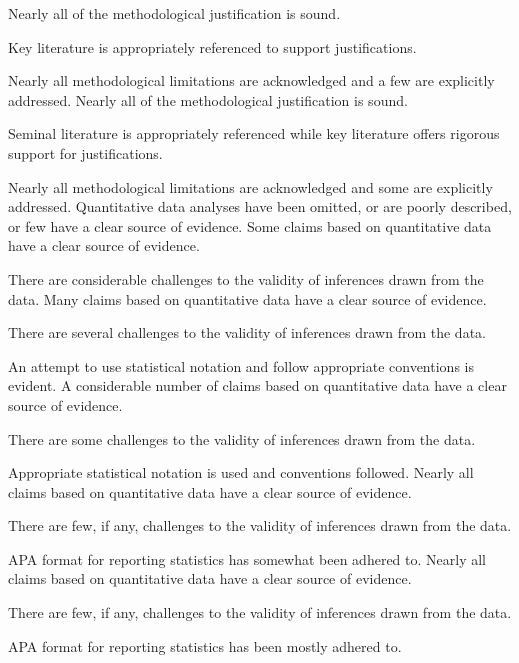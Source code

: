 \documentclass{../../../fal_assignment}
\begin{document}
\begin{markingrubric}
        \grade 		Nearly all  of the methodological justification is sound.
        \par		Key literature is appropriately referenced to support justifications.
        \par 		Nearly all methodological limitations are acknowledged and a few are explicitly addressed.
        \grade 		Nearly all  of the methodological justification is sound.
        \par		Seminal literature is appropriately referenced while key literature offers rigorous support for justifications.
        \par		Nearly all methodological limitations are acknowledged and some are explicitly addressed.
%
        \grade\fail 	Quantitative data analyses have been omitted, or are poorly described, or few have a clear source of evidence.
        \grade		Some claims based on quantitative data have a clear source of evidence.
	\par 		There are considerable challenges to the validity of inferences drawn from the data.
        \grade		Many claims based on quantitative data have a clear source of evidence.
        \par 		There are several challenges to the validity of inferences drawn from the data.
	\par 		An attempt to use statistical notation and follow appropriate conventions is evident.
        \grade		A considerable number of claims based on quantitative data have a clear source of evidence.
        \par		There are some challenges to the validity of inferences drawn from the data.
        \par 		Appropriate statistical notation is used and conventions followed.
        \grade		Nearly all claims based on quantitative data have a clear source of evidence.
        \par		There are few, if any, challenges to the validity of inferences drawn from the data.
        \par 		APA format for reporting statistics has somewhat been adhered to.
        \grade		Nearly all claims based on quantitative data have a clear source of evidence.
        \par		There are few, if any, challenges to the validity of inferences drawn from the data.
        \par 		APA format for reporting statistics has been mostly adhered to.

\end{markingrubric}
\end{document}
